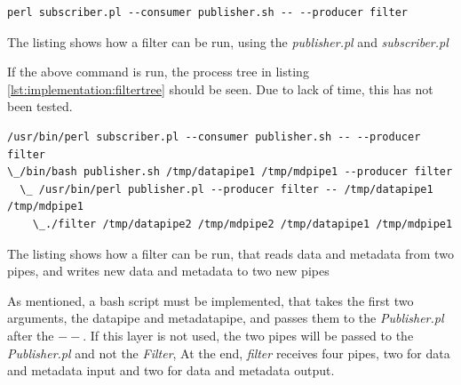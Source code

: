 \begin{listing}[H] 
\begin{verbatim}
perl subscriber.pl --consumer publisher.sh -- --producer filter
\end{verbatim}
\caption{The listing shows how a filter can be run, using the \textit{publisher.pl} and \textit{subscriber.pl}}
\label{lst:implementation:filter}
\end{listing}

If the above command is run, the process tree in listing \ref{lst:implementation:filtertree} should be seen. Due to lack of time, this has not been tested.

\begin{listing}[H] 
\begin{verbatim}
/usr/bin/perl subscriber.pl --consumer publisher.sh -- --producer filter
\_/bin/bash publisher.sh /tmp/datapipe1 /tmp/mdpipe1 --producer filter
  \_ /usr/bin/perl publisher.pl --producer filter -- /tmp/datapipe1 /tmp/mdpipe1
    \_./filter /tmp/datapipe2 /tmp/mdpipe2 /tmp/datapipe1 /tmp/mdpipe1
\end{verbatim}
\caption{The listing shows how a filter can be run, that reads data and metadata from two pipes, and writes new data and metadata to two new pipes}
\label{lst:implementation:filter}
\end{listing}
As mentioned, a bash script must be implemented, that takes the first two arguments, the datapipe and metadatapipe, and passes them to the \textit{Publisher.pl} after the $--$. If this layer is not used, the two pipes will be passed to the \textit{Publisher.pl} and not the \textit{Filter}, At the end, \textit{filter} receives four pipes, two for data and metadata input and two for data and metadata output.

